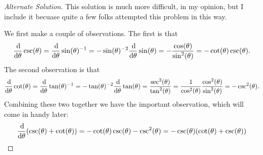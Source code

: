 \documentclass[12pt]{amsart}
\begin{document}
\begin{proof}[Alternate Solution]
  This solution is much more difficult, in my opinion, but I include it becuase quite a few folks attempted this problem in this way.

  We first make a couple of observations.
  The first is that
  \[\frac{\dif}{\dif \theta} \csc(\theta) = \frac{\dif}{\dif \theta} \sin(\theta)^{-1} = -\sin(\theta)^{-2} \frac{\dif}{\dif \theta} \sin(\theta) = -\frac{\cos(\theta)}{\sin^2(\theta)} = -\cot(\theta)\csc(\theta).\]
  The second observation is that
  \[\frac{\dif}{\dif \theta} \cot(\theta) = \frac{\dif}{\dif \theta} \tan(\theta)^{-1} = -\tan(\theta)^{-2} \frac{\dif}{\dif \theta} \tan(\theta) = \frac{\sec^2(\theta)}{\tan^2(\theta)} = \frac{1}{\cos^2(\theta)}\frac{\cos^2(\theta)}{\sin^2(\theta)} = -\csc^2(\theta).\]
  Combining these two together we have the important observation, which will come in handy later:
  \[\frac{\dif}{\dif \theta}(\csc(\theta) + \cot(\theta)) = -\cot(\theta)\csc(\theta) - \csc^2(\theta) =-\csc(\theta)(\cot(\theta) + \csc(\theta))\]


\end{proof}
\end{document}

